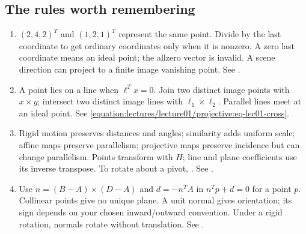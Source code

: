 \documentclass[letterpaper,11pt,english,openany,oneside]{jupyterBook}
\begin{document}
\subsection{The rules worth remembering}
\label{\detokenize{lectures/lecture01/tldr:the-rules-worth-remembering}}\begin{enumerate}
%
\item {}
\sphinxAtStartPar
{} \((2,4,2)^T\) and \((1,2,1)^T\) represent the same point. Divide by the last coordinate to get ordinary coordinates only when it is nonzero. A zero last coordinate means an ideal point; the all\sphinxhyphen{}zero vector is invalid. A scene direction can project to a finite image vanishing point. See {\hyperref[\detokenize{lectures/lecture01/projective:lec01-projective}]{}}.

\item {}
\sphinxAtStartPar
{} A point lies on a line when \(\ell^Tx=0\). Join two distinct image points with \(x\times y\); intersect two distinct image lines with \(\ell_1\times\ell_2\). Parallel lines meet at an ideal point. See \eqref{equation:lectures/lecture01/projective:eq-lec01-cross}.

\item {}
\sphinxAtStartPar
{} Rigid motion preserves distances and angles; similarity adds uniform scale; affine maps preserve parallelism; projective maps preserve incidence but can change parallelism. Points transform with \(H\); line and plane coefficients use its inverse transpose. To rotate about a pivot, . See {\hyperref[\detokenize{lectures/lecture01/transformations:lec01-transformations}]{}}.

\item {}
\sphinxAtStartPar
{} Use \(n=(B-A)\times(D-A)\) and \(d=-n^TA\) in \(n^Tp+d=0\) for a point \(p\). Collinear points give no unique plane. A unit normal gives orientation; its sign depends on your chosen inward/outward convention. Under a rigid rotation, normals rotate without translation. See {\hyperref[\detokenize{lectures/lecture01/planes-lines:lec01-planes}]{}}.


\end{enumerate}
\end{document}
